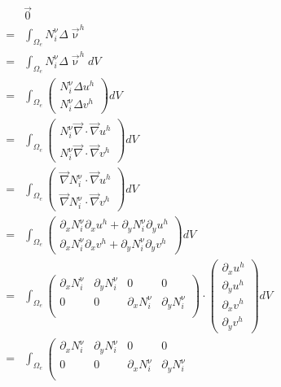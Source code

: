 \begin{eqnarray}
&&\vec 0 \nonumber\\
&=& \int_{\Omega_e} N_i^\upnu  \Delta \vec{\upnu}^h \nonumber\\ 
&=&\int_{\Omega_e} N_i^\upnu \Delta \vec\upnu^h dV \nonumber\\
&=&\int_{\Omega_e}  \left(\begin{array}{c}
N_i^\upnu \Delta u^h \\
N_i^\upnu \Delta v^h 
\end{array}\right) dV \nonumber\\
&=&\int_{\Omega_e}  \left(\begin{array}{c}
N_i^\upnu \vec\nabla \cdot \vec\nabla u^h \\
N_i^\upnu \vec\nabla \cdot \vec\nabla v^h 
\end{array}\right) dV \nonumber\\
&=&
\int_{\Omega_e}   \left(\begin{array}{c}
\vec\nabla N_i^\upnu \cdot \vec\nabla u^h \\
\vec\nabla N_i^\upnu \cdot \vec\nabla v^h 
\end{array}\right) dV \nonumber\\
&=&
\int_{\Omega_e}
\left(\begin{array}{c}
\partial_x N_i^\upnu \partial_x u^h + \partial_y N_i^\upnu \partial_y u^h \\ 
\partial_x N_i^\upnu \partial_x v^h + \partial_y N_i^\upnu \partial_y v^h 
\end{array}\right) dV \nonumber\\
&=&\int_{\Omega_e}
\left(
\begin{array}{cccc}
\partial_x N_i^\upnu & \partial_y N_i^\upnu & 0 & 0 \\ 
0 & 0 & \partial_x N_i^\upnu & \partial_y N_i^\upnu  \\ 
\end{array}
\right)
\!\cdot\!
\left(
\begin{array}{c}
\partial_x u^h \\
\partial_y u^h \\
\partial_x v^h \\
\partial_y v^h 
\end{array}
\right) dV \nonumber\\
&=&\int_{\Omega_e}
\left(
\begin{array}{cccc}
\partial_x N_i^\upnu & \partial_y N_i^\upnu & 0 & 0 \\ 
0 & 0 & \partial_x N_i^\upnu & \partial_y N_i^\upnu  \\ 

\end{array}
\end{eqnarray}
